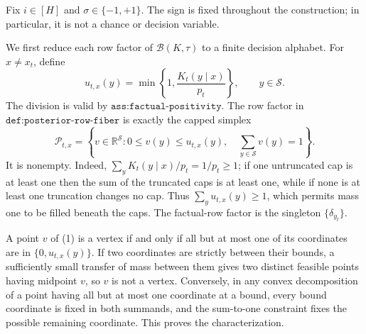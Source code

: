 Fix \(i\in[H]\) and \(\sigma\in\{-1,+1\}\).  The sign is fixed throughout the construction; in particular, it is not a chance or decision variable.

We first reduce each row factor of \(\mathcal B(K,\tau)\) to a finite decision alphabet.  For \(x\ne x_t\), define
\[
 u_{t,x}(y)=\min\!\left\{1,\frac{K_t(y\mid x)}{p_t}\right\},
 \qquad y\in\mathcal S.
\]
The division is valid by \(\texttt{ass:factual-positivity}\).  The row factor in \(\texttt{def:posterior-row-fiber}\) is exactly the capped simplex
\[
 \mathcal P_{t,x}=\left\{v\in\mathbb R^{\mathcal S}:
 0\le v(y)\le u_{t,x}(y),\quad
 \sum_{y\in\mathcal S}v(y)=1\right\}.
 \tag{1}
\]
It is nonempty.  Indeed, \(\sum_yK_t(y\mid x)/p_t=1/p_t\ge1\); if one untruncated cap is at least one then the sum of the truncated caps is at least one, while if none is at least one truncation changes no cap.  Thus \(\sum_yu_{t,x}(y)\ge1\), which permits mass one to be filled beneath the caps.  The factual-row factor is the singleton \(\{\delta_{y_t}\}\).

A point \(v\) of (1) is a vertex if and only if all but at most one of its coordinates are in \(\{0,u_{t,x}(y)\}\).  If two coordinates are strictly between their bounds, a sufficiently small transfer of mass between them gives two distinct feasible points having midpoint \(v\), so \(v\) is not a vertex.  Conversely, in any convex decomposition of a point having all but at most one coordinate at a bound, every bound coordinate is fixed in both summands, and the sum-to-one constraint fixes the possible remaining coordinate.  This proves the characterization.

